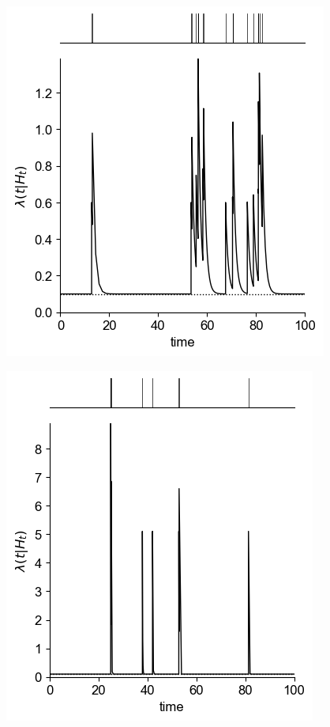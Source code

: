 \documentclass[landscape,final,a0paper]{../baposter}
\begin{document}
\begin{poster}
{\vspace{-0.5em}
\begin{minipage}[t]{0.3\textwidth}
    \centering
    \includegraphics[width=\textwidth]{Blackboard files/img/Picture/Picture1.png}
\end{minipage}
\hfill
\begin{minipage}[t]{0.3\textwidth}
    \centering
    \includegraphics[width=\textwidth]{Blackboard files/img/Picture/Picture2.png}
    

\end{minipage}}
\end{poster}
\end{document}
